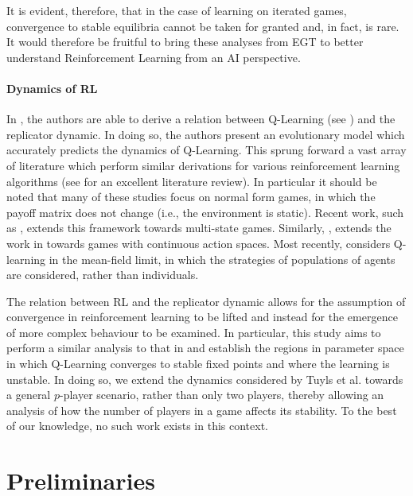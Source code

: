\documentclass[sigconf,anonymous]{aamas}
\begin{document}
It is evident, therefore, that in the case of learning on iterated
games, convergence to stable equilibria cannot be taken for granted
and, in fact, is rare. It would therefore be fruitful to bring these
analyses from EGT to better understand Reinforcement Learning from an
AI perspective.

\paragraph{Dynamics of RL}
In \cite{Tuyls2006AnGames}, the authors are able to derive a relation
between Q-Learning (see \cite{Barber2012}) and the replicator
dynamic. In doing so, the authors present an evolutionary model which
accurately predicts the dynamics of Q-Learning. This sprung forward a
vast array of literature which perform similar derivations for various
reinforcement learning algorithms (see \cite{Bloembergen2015} for an
excellent literature review). In particular it should be noted that
many of these studies focus on normal form games, in which the payoff
matrix does not change (i.e., the environment is static). Recent work,
such as \cite{Hennes2008}, extends this framework towards multi-state
games.
Similarly, \cite{Galstyan2013}, extends the work in
\cite{Tuyls2006AnGames} towards games with continuous action
spaces. Most recently, \cite{Hu2019} considers Q-learning in the
mean-field limit, in which the strategies of populations of agents are
considered, rather than individuals.

The relation between RL and the replicator dynamic allows for the
assumption of convergence in reinforcement learning to be lifted and
instead for the emergence of more complex behaviour to be examined. In
particular, this study aims to perform a similar analysis to that in
\cite{Sanders2018} and establish the regions in parameter space in
which Q-Learning converges to stable fixed points and where the
learning is unstable. In doing so, we extend the dynamics considered by Tuyls et al. towards a general $p$-player scenario, rather than only two players, thereby allowing an analysis of how the number of players in a game affects its stability. To the best of our knowledge, no such work
exists in this context.


\section{Preliminaries}
\end{document}
